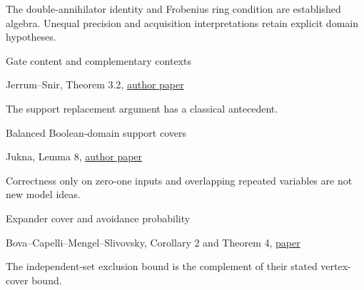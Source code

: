 \documentclass[11pt,a4paper]{article}
\newlength{\OfflineResearchTableWidth}
\newcommand{\OfflineResearchRow}{\par}
\newenvironment{OfflineResearchTable}{%
  \par\medskip\begingroup\small\setlength{\parindent}{0pt}%
  \setlength{\parskip}{3pt plus 1pt minus .5pt}%
  \setlength{\OfflineResearchTableWidth}{\linewidth}%
}{%
  \par\endgroup\medskip%
}
\begin{document}
\begin{OfflineResearchTable}
\begin{minipage}[t]{0.34020\OfflineResearchTableWidth}
\end{minipage}\hfill%
\begin{minipage}[t]{0.36855\OfflineResearchTableWidth}\raggedright
The double-annihilator identity and Frobenius ring condition are
established algebra. Unequal precision and acquisition interpretations
retain explicit domain hypotheses.
\end{minipage}%
\OfflineResearchRow
\noindent%
\begin{minipage}[t]{0.23625\OfflineResearchTableWidth}\raggedright
Gate content and complementary contexts
\end{minipage}\hfill%
\begin{minipage}[t]{0.34020\OfflineResearchTableWidth}\raggedright
Jerrum--Snir, Theorem 3.2,
\href{https://snir.cs.illinois.edu/listed/J7.pdf}{author paper}
\end{minipage}\hfill%
\begin{minipage}[t]{0.36855\OfflineResearchTableWidth}\raggedright
The
support replacement argument has a classical antecedent.
\end{minipage}%
\OfflineResearchRow
\noindent%
\begin{minipage}[t]{0.23625\OfflineResearchTableWidth}\raggedright
Balanced Boolean-domain support covers
\end{minipage}\hfill%
\begin{minipage}[t]{0.34020\OfflineResearchTableWidth}\raggedright
Jukna, Lemma 8,
\href{https://web.vu.lt/mif/s.jukna/ftp/counting-web.pdf}{author paper}
\end{minipage}\hfill%
\begin{minipage}[t]{0.36855\OfflineResearchTableWidth}\raggedright
Correctness only on zero-one inputs and overlapping repeated variables
are not new model ideas.
\end{minipage}%
\OfflineResearchRow
\noindent%
\begin{minipage}[t]{0.23625\OfflineResearchTableWidth}\raggedright
Expander cover and avoidance probability
\end{minipage}\hfill%
\begin{minipage}[t]{0.34020\OfflineResearchTableWidth}\raggedright
Bova--Capelli--Mengel--Slivovsky, Corollary 2 and Theorem 4,
\href{https://arxiv.org/abs/1411.1995}{paper}
\end{minipage}\hfill%
\begin{minipage}[t]{0.36855\OfflineResearchTableWidth}\raggedright
The independent-set
exclusion bound is the complement of their stated vertex-cover bound.
\end{minipage}%

\end{OfflineResearchTable}
\end{document}
